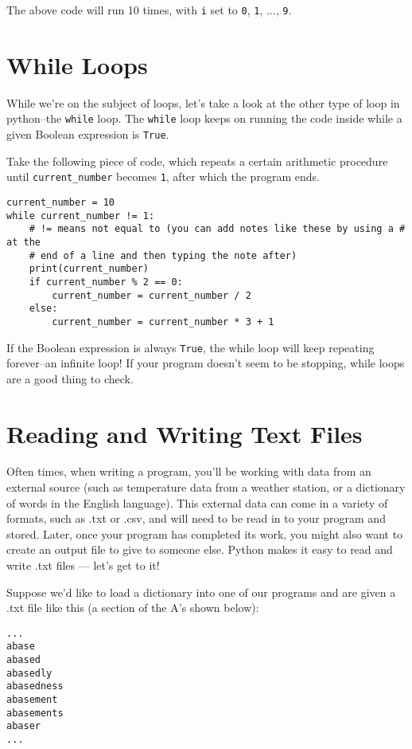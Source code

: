 The above code will run 10 times, with \texttt{i} set to \texttt{0}, \texttt{1}, ..., \texttt{9}. 


\section*{While Loops}

While we're on the subject of loops, let's take a look at the other type of loop in python--the \texttt{while} loop. The \texttt{while} loop keeps on running the code inside while a given Boolean expression is \texttt{True}.

Take the following piece of code, which repeats a certain arithmetic procedure until \texttt{current\_number} becomes \texttt{1}, after which the program ends.

\begin{lstlisting}
current_number = 10
while current_number != 1: 
	# != means not equal to (you can add notes like these by using a # at the 
	# end of a line and then typing the note after)
	print(current_number)
	if current_number % 2 == 0:
		current_number = current_number / 2
	else:
		current_number = current_number * 3 + 1
\end{lstlisting}

If the Boolean expression is always \texttt{True}, the while loop will keep repeating forever--an infinite loop! If your program doesn't seem to be stopping, while loops are a good thing to check.


\section*{Reading and Writing Text Files}

Often times, when writing a program, you'll be working with data from an external source (such as temperature data from a weather station, or a dictionary of words in the English language). This external data can come in a variety of formats, such as .txt or .csv, and will need to be read in to your program and stored. Later, once your program has completed its work, you might also want to create an output file to give to someone else. 
Python makes it easy to read and write .txt files --- let's get to it!

Suppose we'd like to load a dictionary into one of our programs and are given a .txt file like this (a section of the A's shown below):

\begin{verbatim}
...
abase
abased
abasedly
abasedness
abasement
abasements
abaser
...
\end{verbatim}

